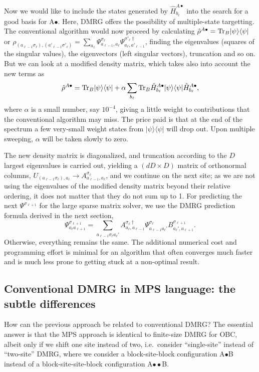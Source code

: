 \documentclass[a4paper,10pt,oneside,onecolumn,1p,times]{elsarticle}
\newcommand{\tr}{{\rm Tr }}
\newcommand{\bra}[1]{\mbox{$\langle #1  |$}}
\newcommand{\ket}[1]{\mbox{$| #1  \rangle$}}
\begin{document}
Now we would like to include the states generated by $\hat{H}^{A\bullet}_{b_{\ell}}$ into the search for a good basis for A$\bullet$. Here, DMRG offers the possibility of multiple-state targetting. The conventional algorithm would now proceed by calculating $\hat{\rho}^{A\bullet} = \tr_B \ket{\psi}\bra{\psi}$ or $\rho_{(a_{\ell-1} \sigma_{\ell}),(a'_{\ell-1}  \sigma'_{\ell})} = \sum_{a_{\ell}} \Psi^{\sigma_{\ell}}_{a_{\ell-1},a_{\ell}}\Psi^{\sigma'_{\ell}\dagger}_{a_{\ell},a'_{\ell-1}}$, finding the eigenvalues (squares of the singular values), the eigenvectors (left singular vectors), truncation and so on. But we can look at a modified density matrix, which takes also into account the new terms as
\begin{equation}
\hat{\rho}^{A\bullet} = \tr_B \ket{\psi}\bra{\psi} + \alpha \sum_{b_{\ell}} \tr_B \hat{H}^{A\bullet}_{b_{\ell}} \ket{\psi} \bra{\psi} \hat{H}^{A\bullet}_{b_{\ell}} ,
\end{equation}
where $\alpha$ is a small number, say $10^{-4}$, giving a little weight to contributions that the conventional algorithm may miss. The price paid is that at the end of the spectrum a few very-small weight states from $\ket{\psi}\bra{\psi}$ will drop out. Upon multiple sweeping, $\alpha$ will be taken slowly to zero.

The new density matrix is diagonalized, and truncation according to the $D$ largest eigenvalues is carried out, yielding a $(dD \times D)$ matrix of orthonormal columns, $U_{(a_{\ell-1}\sigma_{\ell}), a_{\ell}} \rightarrow A^{\sigma_{\ell}}_{a_{\ell-1}, a_{\ell}}$, and we continue on the next site; as we are not using the eigenvalues of the modified density matrix beyond their relative ordering, it does not matter that they do not sum up to 1. For predicting the next $\Psi^{\sigma_{\ell+1}}$ for the large sparse matrix solver, we use the DMRG prediction formula derived in the next section,
\begin{equation}
\Psi^{\sigma_{\ell+1}}_{a_{\ell}a_{\ell+1}} = 
\sum_{a_{\ell-1}\sigma_{\ell} a_{\ell}'} 
A^{\sigma_{\ell} \dagger}_{a_{\ell},a_{\ell-1}} \Psi^{\sigma_{\ell}}_{a_{\ell-1}a_{\ell}'}  B^{\sigma_{\ell+1}}_{a_{\ell}', a_{\ell+1}} .
\end{equation}
Otherwise, everything remains the same. The additional numerical cost and programming effort is minimal for an algorithm that often converges much faster and is much less prone to getting stuck at a non-optimal result.

\subsection{Conventional DMRG in MPS language: the subtle differences}   
\label{subsec:conventionalDMRGinMPS}
How can the previous approach be related to conventional DMRG? The essential answer is that the MPS approach is identical to finite-size DMRG for OBC, albeit only if we shift one site instead of two,
i.e.\ consider ``single-site'' instead of ``two-site'' DMRG, where we consider a block-site-block configuration A$\bullet$B instead of a block-site-site-block configuration A$\bullet\bullet$B.
\end{document}

